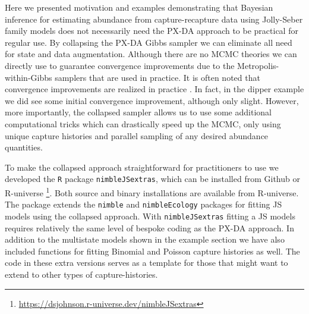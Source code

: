 \documentclass[12pt]{article}
\begin{document}
Here we presented motivation and examples demonstrating that Bayesian inference for estimating abundance from capture-recapture data using Jolly-Seber family models does not necessarily need the PX-DA approach to be practical for regular use. By collapsing the PX-DA Gibbs sampler we can eliminate all need for state and data augmentation. Although there are no MCMC theories we can directly use to guarantee convergence improvements due to the Metropolis-within-Gibbs samplers that are used in practice. It is often noted that convergence improvements are realized in practice \citep{VanDykJiao2015a}. In fact, in the dipper example we did see some initial convergence improvement, although only slight. However, more importantly, the collapsed sampler allows us to use some additional computational tricks which can drastically speed up the MCMC, only using unique capture histories and parallel sampling of any desired abundance quantities. 

To make the collapsed approach straightforward for practitioners to use we developed the {\tt R} package \verb|nimbleJSextras|, which can be installed from Github or R-universe \footnote{\url{https://dsjohnson.r-universe.dev/nimbleJSextras}}. Both source and binary installations are available from R-universe. The package extends the \verb|nimble| and \verb|nimbleEcology| packages for fitting JS models using the collapsed approach. With \verb|nimbleJSextras| fitting a JS models requires relatively the same level of bespoke  coding as the PX-DA approach. In addition to the multistate models shown in the example section we have also included functions for fitting Binomial and Poisson capture histories as well. The code in these extra versions serves as a template for those that might want to extend to other types of capture-histories. 
\end{document}
